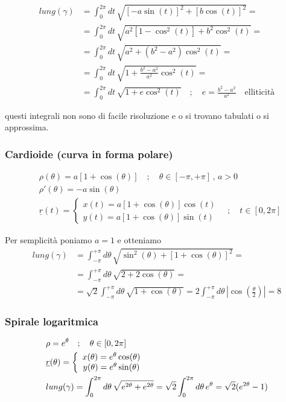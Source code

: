 \begin{align}
lung(\gamma) {}&= \int_{0}^{2\pi} dt \, \sqrt{[-a \sin(t)]^2 + [b \cos(t)]^2} = \nonumber \\
&= \int_{0}^{2\pi} dt \, \sqrt{a^2 [1-\cos^2(t)] + b^2 \cos^2(t)}  = \nonumber \\
&= \int_{0}^{2\pi} dt \, \sqrt{a^2 + (b^2-a^2)\cos^2(t)} = \nonumber \\
&= \int_{0}^{2\pi} dt \, \sqrt{1 + \frac{b^2-a^2}{a^2}\cos^2(t)} = \nonumber \\
&= \int_{0}^{2\pi} dt \, \sqrt{1 + e \cos^2(t)} \quad ; \quad e= \frac{b^2-a^2}{a^2} \quad \text{elliticità}
\end{align}

questi integrali non sono di facile risoluzione e o si trovano tabulati o si approssima.

\newpage

\subsubsection{Cardioide (curva in forma polare)}

\begin{align}
{}&\rho(\theta)= a[1+\cos(\theta)] \quad ; \quad \theta \in [-\pi, +\pi] \, , \, a>0 \\
&\rho'(\theta)= - a \sin(\theta) \\
&\underline{r}(t)=\left\{
\begin{array}{cc}
x(t)= a[1+\cos(\theta)] \cos(t) \\
y(t)= a[1+\cos(\theta)] \sin(t)
\end{array}
\right. \quad ; \quad t \in [0,2\pi]
\end{align}

Per semplicità poniamo $a=1$ e otteniamo
\begin{align}
lung(\gamma){}&= \int_{-\pi}^{+\pi} d\theta \, \sqrt{\sin^2(\theta) + [1+\cos(\theta)]^2} = \nonumber \\
&= \int_{-\pi}^{+\pi} d\theta \, \sqrt{ 2 + 2 \cos(\theta)}= \nonumber \\
&=\sqrt{2} \int_{-\pi}^{+\pi} d\theta \, \sqrt{ 1 +  \cos(\theta)}= 2 \int_{-\pi}^{+\pi} d\theta \, \left|\cos\left(\frac{\theta}{2}\right)\right|=8
\end{align}


\subsubsection{Spirale logaritmica}
\begin{align}
{}&\rho = e^{\theta} \quad ; \quad \theta\in[0,2\pi]\\
&\underline{r}(\theta)=\left\{\begin{array}{cc} x(\theta)= e^{\theta}\cos(\theta)  \\ y(\theta) = e^{\theta}\sin (\theta) \end{array}\right.\\
& lung(\gamma)= \int_{0}^{2\pi}d\theta \, \sqrt{e^{2\theta} + e^{2\theta}} = \sqrt{2}\int_{0}^{2\pi}d\theta \, e^{\theta}= \sqrt{2}(e^{2\theta} -1)
\end{align}

